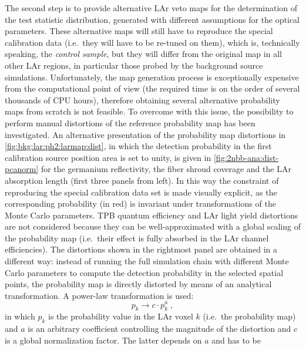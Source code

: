\begin{description}
    \newpar
    The second step is to provide alternative LAr veto maps for the determination of the
    test statistic distribution, generated with different assumptions for the optical
    parameters. These alternative maps will still have to reproduce the special
    calibration data (i.e.~they will have to be re-tuned on them), which is, technically
    speaking, the \emph{control sample}, but they will differ from the original map in all
    other LAr regions, in particular those probed by the background source simulations.
    Unfortunately, the map generation process is exceptionally expensive from
    the computational point of view (the required time is on the order of several
    thousands of CPU hours), therefore obtaining several alternative probability maps from
    scratch is not feasible. To overcome with this issue, the possibility to perform
    manual distortions of the reference probability map has been investigated.
    \newpar
    An alternative presentation of the probability map distortions in
    \cref{fig:bkg:lar:ph2:larmap:dist}, in which the detection probability in the first
    calibration source position area is set to unity, is given in
    \cref{fig:2nbb-ana:dist-pcanorm} for the germanium reflectivity, the fiber shroud
    coverage and the LAr absorption length (first three panels from left). In this way the
    constraint of reproducing the special calibration data set is made visually explicit,
    as the corresponding probability (in red) is invariant under transformations of the
    Monte Carlo parameters. TPB quantum efficiency and LAr light yield distortions are not
    considered because they can be well-approximated with a global scaling of the
    probability map (i.e.~their effect is fully absorbed in the LAr channel efficiencies).
    The distortions shown in the rightmost panel are obtained in a different way: instead
    of running the full simulation chain with different Monte Carlo parameters to compute
    the detection probability in the selected spatial points, the probability map is
    directly distorted by means of an analytical transformation. A power-law
    transformation is used:
    \begin{equation}\label{eq:2nbb-ana:powerlaw}
      p_k \rightarrow c \cdot p_k^a \;,
    \end{equation}
    in which $p_k$ is the probability value in the LAr voxel $k$ (i.e.~the probability
    map) and $a$ is an arbitrary coefficient controlling the magnitude of the distortion
    and $c$ is a global normalization factor. The latter depends on $a$ and has to be

\end{description}
